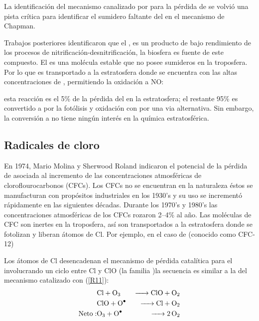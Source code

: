 La identificación del mecanismo canalizado por  para la pérdida de  se volvió una pista crítica para identificar el sumidero faltante del  en el mecanismo de Chapman.

Trabajos posteriores identificaron que el , es un producto de bajo rendimiento de los procesos de nitrificación-desnitrificación, la biosfera es fuente de este compuesto. El  es una molécula estable que no posee sumideros en la troposfera. Por lo que es transportado a la estratosfera donde se encuentra con las altas concentraciones de , permitiendo la oxidación a NO:

esta reacción es el 5\% de la pérdida del   en la estratosfera; el restante 95\% es convertido a  por la fotólisis y oxidación con    por una via alternativa. Sin embargo, la conversión a  no tiene ningún interés en la química estratosférica.

\subsection{Radicales de cloro}\label{rclo}
En 1974, Mario Molina y Sherwood Roland indicaron el potencial de la pérdida de  asociada al incremento de las concentraciones atmosféricas de cloroflourocarbonos (CFCs). Los CFCs no se encuentran en la naturaleza éstos se manufacturan con propósitos industriales en los 1930's  y su uso se incrementó rápidamente en las siguientes décadas. Durante los 1970's y 1980's las concentraciones atmosféricas de los CFCs rozaron 2--4\% al año. Las moléculas de CFC son inertes en la troposfera,  así son transportados a la estratosfera donde se fotolizan y liberan átomos de Cl. Por ejemplo, en el caso de  (conocido como CFC-12) 

Los átomos de Cl  desencadenan el mecanismo de pérdida catalítica para el  involucrando un ciclo entre Cl y ClO (la familia )la secuencia es similar a la del mecanismo catalizado con  (\ref{R11}):
\begin{eqnarray*}
            & \ce{Cl + O3     &->   ClO + O2}  \\
            &\ce{ClO +  O^.   & ->   Cl + O2 }  \\
  \mathrm{Neto: } &\ce{O3 + O^.   &->  2O2} 
\end{eqnarray*}

